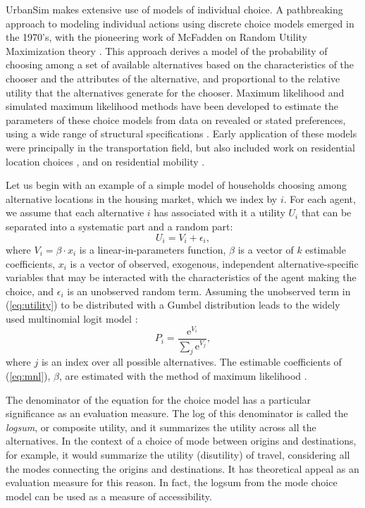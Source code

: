 UrbanSim makes extensive use of models of individual choice.  
A pathbreaking approach to modeling individual actions using discrete
choice models emerged in the 1970's, with the pioneering work of
McFadden on Random Utility Maximization theory
\cite{mcfadden-1974,mcfadden-1981}. This approach derives a model of
the probability of choosing among a set of available alternatives
based on the characteristics of the chooser and the attributes of
the alternative, and proportional to the relative utility that the
alternatives generate for the chooser. Maximum likelihood and
simulated maximum likelihood methods have been developed to estimate
the parameters of these choice models from data on revealed or
stated preferences, using a wide range of structural specifications
\cite{train-book-2003}. Early application of these models were
principally in the transportation field, but also included work on
residential location choices
\cite{quigley-eer-1976,lerman-trr-1977,mcfadden-1978}, and
on residential mobility \cite{clark-vanlierop-1986}.

Let us begin with an example of a simple model of households choosing among
alternative locations in the housing market, which we index by
$i$. For each agent, we assume that each alternative $i$ has
associated with it a utility $U_i$ that can be separated into a
systematic part and a random part:
\begin{equation}
    U_i = V_i + \epsilon_i,
    \label{eq:utility}
\end{equation}
where $V_i = \beta\cdot {x}_i$ is a linear-in-parameters
function, $\beta$ is a vector of $k$ estimable coefficients,
$x_i$ is a vector of observed, exogenous, independent
alternative-specific variables that may be interacted with the
characteristics of the agent making the choice, and $\epsilon_i$
is an unobserved random term. Assuming the unobserved term in
(\ref{eq:utility}) to be distributed with a Gumbel distribution
leads to the  widely used multinomial logit model
\cite{mcfadden-1974,mcfadden-1981}:
\begin{equation}
    P_i = \frac{\mathrm{e}^{V_i}}{\sum_j \mathrm{e}^{V_j}},
    \label{eq:mnl}
\end{equation}
where $j$ is an index over all possible alternatives. The
estimable coefficients of (\ref{eq:mnl}), $\beta$, are
estimated with the method of maximum likelihood 
\cite{greene-2002}.

The denominator of the equation for the choice model has a particular
significance as an evaluation measure.  The log of this denominator
is called the \emph{logsum}, or composite utility, and it summarizes
the utility across all the alternatives.  In the context of a choice of
mode between origins and destinations, for example, it would summarize
the utility (disutility) of travel, considering all the modes connecting the
origins and destinations.  It has theoretical appeal as an evaluation
measure for this reason.  In fact, the logsum from the mode choice
model can be used as a measure of accessibility.

